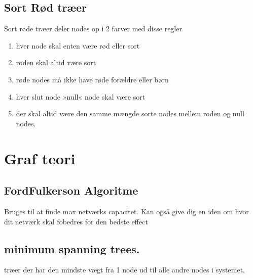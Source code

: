 \documentclass[letterpaper,10pt,danish]{sphinxmanual}
\begin{document}
\subsection{Sort Rød træer}
\label{\detokenize{Algorithmer/BinaryTrees:sort-rod-traeer}}
\sphinxAtStartPar
Sort røde træer deler nodes op i 2 farver med disse regler
\begin{enumerate}
%
\item {} 
\sphinxAtStartPar
hver node skal enten være rød eller sort

\item {} 
\sphinxAtStartPar
roden skal altid være sort

\item {} 
\sphinxAtStartPar
røde nodes må ikke have røde forældre eller børn

\item {} 
\sphinxAtStartPar
hver slut node »null« node skal være sort

\item {} 
\sphinxAtStartPar
der skal altid være den samme mængde sorte nodes mellem roden og null nodes.

\end{enumerate}

\sphinxstepscope


\section{Graf teori}
\label{\detokenize{Algorithmer/Graphs:graf-teori}}\label{\detokenize{Algorithmer/Graphs::doc}}

\subsection{Ford\sphinxhyphen{}Fulkerson Algoritme}
\label{\detokenize{Algorithmer/Graphs:ford-fulkerson-algoritme}}
\sphinxAtStartPar
Bruges til at finde max netværks capacitet. Kan også give dig en iden om hvor dit netværk skal fobedres for den bedste effect

\sphinxAtStartPar
{}


\subsection{minimum spanning trees.}
\label{\detokenize{Algorithmer/Graphs:minimum-spanning-trees}}
\sphinxAtStartPar
træer der har den mindste vægt fra 1 node ud til alle andre nodes i systemet.
\end{document}
